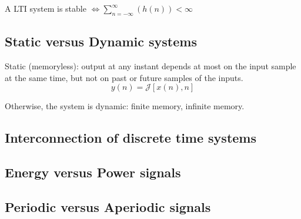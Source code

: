A LTI system is stable $\Leftrightarrow \displaystyle \sum_{n=-\infty}^{\infty} (h(n))<\infty$
\subsection{Static versus Dynamic systems}
Static (memoryless): output at any instant depends at most on the input sample at the same time, but not on past or future samples of the inputs.
\begin{equation*}
    y(n) = \mathcal{J} [x(n),n]
\end{equation*}

Otherwise, the system is dynamic: finite memory, infinite memory.
\subsection{Interconnection of discrete time systems}
\subsection{Energy versus Power signals}
\subsection{Periodic versus Aperiodic signals}